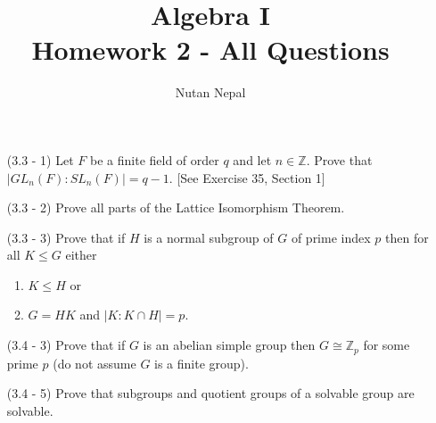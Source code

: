 \documentclass[12pt]{article}
\title{Algebra I\\
\large Homework 2 - All Questions
}
\author{Nutan Nepal}
\newcommand{\mz}{\mathbb{Z}}
\begin{document}
\maketitle
\makebox[\linewidth]{\rule{190mm}{.5pt}}
\vspace{0mm}
\begin{enumerate}

\item[(3.3 - 1)] Let $F$ be a finite field of order $q$
    and let $n\in\mz$.
    Prove that $|GL_n(F):SL_n(F)|=q-1$. [See Exercise 35,
    Section 1]

\begin{mybox}

    \vspace*{10mm}
\end{mybox}


\item[(3.3 - 2)] Prove all parts of the Lattice
    Isomorphism Theorem.

\begin{mybox}
            
    \vspace*{10mm}
\end{mybox}

\item[(3.3 - 3)] Prove that if $H$ is a normal subgroup
    of $G$ of prime index $p$ then for all $K\leq G$
    either
    \begin{enumerate}
        \item $K\leq H$ or
        \item $G=HK$ and $|K:K\cap H|=p$.
    \end{enumerate}
\begin{mybox}
       
    \vspace*{10mm}
\end{mybox}
  
\item[(3.4 - 3)] Prove that if $G$ is an abelian
    simple group then $G\cong \mz_p$ for some prime 
    $p$ (do not assume $G$ is a finite group).

\begin{mybox}

    \vspace*{10mm}
\end{mybox}

\item[(3.4 - 5)] Prove that subgroups and quotient
    groups of a solvable group are solvable.

\begin{mybox}


\end{mybox}
\end{enumerate}
\end{document}
